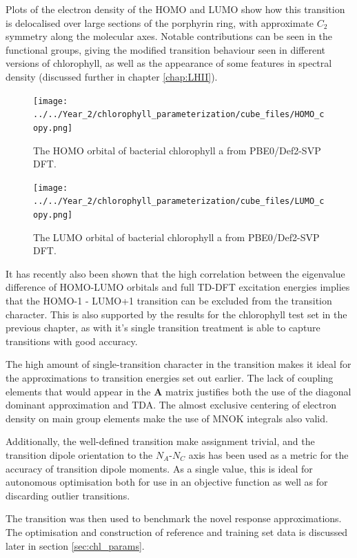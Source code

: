 Plots of the electron density of the HOMO and LUMO show how
this transition is delocalised over large sections of the porphyrin ring, with 
approximate $C_2$ symmetry along the molecular axes. Notable contributions can be
seen in the functional groups, giving the modified transition behaviour seen in 
different versions of chlorophyll, as well as the appearance of some features in
spectral density (discussed further in chapter \ref{chap:LHII}).

\begin{figure}
    \centering
    \texttt{[image: ../../Year\_2/chlorophyll\_parameterization/cube\_files/HOMO\_copy.png]}
    \caption{The HOMO orbital of bacterial chlorophyll a from PBE0/Def2-SVP DFT.}
    \label{fig:HOMO}
\end{figure}

\begin{figure}
    \centering
    \texttt{[image: ../../Year\_2/chlorophyll\_parameterization/cube\_files/LUMO\_copy.png]}
    \caption{The LUMO orbital of bacterial chlorophyll a from PBE0/Def2-SVP DFT.}
\end{figure}

It has recently also been shown that the high correlation between the eigenvalue
difference of HOMO-LUMO orbitals and full TD-DFT excitation energies implies that
the HOMO-1 - LUMO+1 transition can be excluded from the transition character. This
is also supported by the results for the chlorophyll test set in the previous chapter,
as \dscf with it's single transition treatment is able to capture \Qy transitions
with good accuracy.

The high amount of single-transition character in the \Qy transition makes it ideal
for the approximations to transition energies set out earlier. The lack of coupling
elements that would appear in the $\mathbf{A}$ matrix justifies both the use of
the diagonal dominant approximation and TDA. The almost exclusive centering of
electron density on main group elements make the use of MNOK integrals also valid.

Additionally, the well-defined transition make assignment trivial, and the transition
dipole orientation to the $N_A$-$N_C$ axis has been used as a metric for the accuracy
of transition dipole moments. As a single value, this is ideal for autonomous optimisation 
both for use in an objective function as well as for discarding outlier transitions.

The \Qy transition was then used to benchmark the novel response approximations.
The optimisation and construction of reference and training set data is discussed
later in section \ref{sec:chl_params}.


